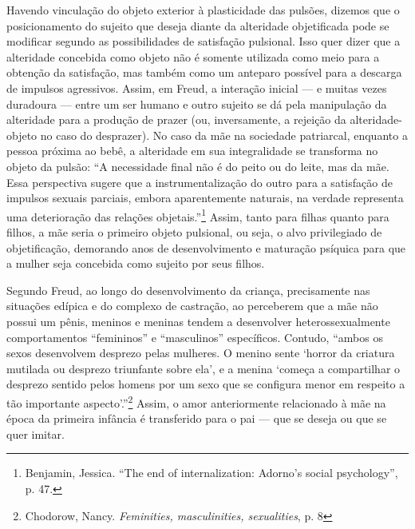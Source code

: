 Havendo vinculação do objeto exterior à plasticidade das pulsões,
dizemos que o posicionamento do sujeito que deseja diante da alteridade
objetificada pode se modificar segundo as possibilidades de satisfação
pulsional. Isso quer dizer que a alteridade concebida como objeto não é
somente utilizada como meio para a obtenção da satisfação, mas também
como um anteparo possível para a descarga de impulsos agressivos. Assim,
em Freud, a interação inicial --- e muitas vezes duradoura --- entre um
ser humano e outro sujeito se dá pela manipulação da alteridade para a
produção de prazer (ou, inversamente, a rejeição da alteridade-objeto no
caso do desprazer). No caso da mãe na sociedade patriarcal, enquanto a
pessoa próxima ao bebê, a alteridade em sua integralidade se transforma
no objeto da pulsão: ``A necessidade final não é do peito ou do leite,
mas da mãe. Essa perspectiva sugere que a instrumentalização do outro
para a satisfação de impulsos sexuais parciais, embora aparentemente
naturais, na verdade representa uma deterioração das relações
objetais.''\footnote{Benjamin, Jessica. ``The end of internalization:
  Adorno's social psychology'', p. 47.} Assim, tanto para filhas quanto
para filhos, a mãe seria o primeiro objeto pulsional, ou seja, o alvo
privilegiado de objetificação, demorando anos de desenvolvimento e
maturação psíquica para que a mulher seja concebida como sujeito por
seus filhos.

Segundo Freud, ao longo do desenvolvimento da criança, precisamente nas
situações edípica e do complexo de castração, ao perceberem que a mãe
não possui um pênis, meninos e meninas tendem a desenvolver
heterossexualmente comportamentos ``femininos'' e ``masculinos''
específicos. Contudo, ``ambos os sexos desenvolvem desprezo pelas
mulheres. O menino sente `horror da criatura mutilada ou desprezo
triunfante sobre ela', e a menina `começa a compartilhar o desprezo
sentido pelos homens por um sexo que se configura menor em respeito a
tão importante aspecto'.''\footnote{Chodorow, Nancy. \emph{Feminities,
  masculinities, sexualities}, p. 8} Assim, o amor anteriormente
relacionado à mãe na época da primeira infância é transferido para o pai
--- que se deseja ou que se quer imitar.

